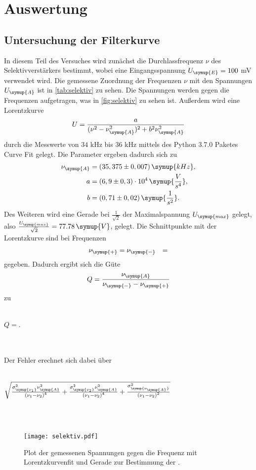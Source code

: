 \section{Auswertung}
\label{sec:Auswertung}
    \subsection{Untersuchung der Filterkurve}
    In diesem Teil des Versuches wird zunächst die Durchlassfrequenz $\nu$ des Selektivverstärkers bestimmt, wobei eine
    Eingangsspannung $U_{\symup{E}} = 100$ mV verwendet wird. Die gemessene Zuordnung
    der Frequenzen $\nu$ mit den Spannungen $U_{\symup{A}}$ ist in \autoref{tab:selektiv} zu sehen. 
    Die Spannungen werden gegen die Frequenzen aufgetragen, was in \autoref{fig:selektiv} zu sehen ist. Außerdem wird eine Lorentzkurve
    \begin{equation}
    \label{eqn:lorentz}
        U = \frac{a}{(\nu^2 - \nu_{\symup{A}}^2)^2 + b^2 \nu_{\symup{A}}^2}
    \end{equation}
    durch die Messwerte von $34$ kHz bis $36$ kHz mittels des Python 3.7.0 Paketes Curve Fit gelegt. Die Parameter ergeben dadurch sich zu 
    \begin{align*}
    \nu_{\symup{A}} &= (35,375 \pm 0,007) \, \symup{kHz}, \\
    a &= (6,9 \pm 0,3) \cdot 10^4 \, \symup{\frac{V}{s^4}}, \\
    b &= (0,71 \pm 0,02) \, \symup{\frac{1}{s^2}}.
    \end{align*}
    Des Weiteren wird eine Gerade bei $\frac{1}{\sqrt{2}}$ der Maximalspannung $U_{\symup{max}}$ gelegt, also
    $\frac{U_{\symup{max}}}{\sqrt{2}} = 77.78 \, \symup{V}$, gelegt. Die Schnittpunkte mit der Lorentzkurve sind bei
    Frequenzen
    \begin{align*}
    \nu_{\symup{+}} &=
    \nu_{\symup{-}} &=
    \end{align*} 
    gegeben. Dadurch ergibt sich die Güte
    \begin{equation}
    \label{eqn:guete}
        Q = \frac{\nu_{\symup{A}}}{\nu_{\symup{-}} - \nu_{\symup{+}}}
    \end{equation}
    zu 
    \\ \\
    \centerline{$Q = $.}    
    \\ \\
    Der Fehler erechnet sich dabei über
    \\ \\
    \centerline{$\sqrt{\frac{\sigma_{\symup{\nu_{1}}}^{2} \nu_{\symup{A}}^{2}}{\left(\nu_{1} - \nu_{2}\right)^{4}} + \frac{\sigma_{\symup{\nu_{2}}}^{2} \nu_{\symup{A}}^{2}}{\left(\nu_{1} - \nu_{2}\right)^{4}} + \frac{\sigma_{\symup{\nu_{\symup{A}}}}^{2}}{\left(\nu_{1} - \nu_{2}\right)^{2}}}$}
    \\ \\
     
    \begin{figure}
        \centering
        \texttt{[image: selektiv.pdf]}
        \caption{Plot der gemessenen Spannungen gegen die Frequenz mit Lorentzkurvenfit und Gerade zur Bestimmung der .}
    \label{fig:selektiv}
    \end{figure}

